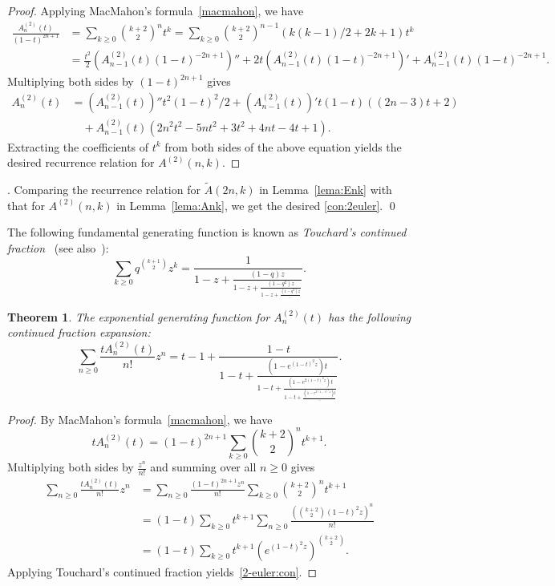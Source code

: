 \documentclass[11pt,reqno]{amsart}
\numberwithin{equation}{section}
\theoremstyle{plain}
\newtheorem{theorem}{Theorem}[section]
\theoremstyle{definition}
\begin{document}
\begin{proof}
Applying MacMahon's formula~\eqref{macmahon}, we have
\begin{align*}
\frac{A_n^{(2)}(t)}{(1-t)^{2n+1}}&=\sum_{k\geq 0}\binom{k+2}{2}^n t^k=\sum_{k\geq 0}\binom{k+2}{2}^{n-1}(k(k-1)/2+2k+1) t^k\\
&=\frac{t^2}{2}(A_{n-1}^{(2)}(t)(1-t)^{-2n+1})''+2t(A_{n-1}^{(2)}(t)(1-t)^{-2n+1})'+A_{n-1}^{(2)}(t)(1-t)^{-2n+1}.
\end{align*}
Multiplying both sides by $(1-t)^{2n+1}$ gives
\begin{align*}
A_n^{(2)}(t)&=(A_{n-1}^{(2)}(t))''t^2(1-t)^2/2+(A_{n-1}^{(2)}(t))'t(1-t)((2n-3)t+2)\\
&\quad+A_{n-1}^{(2)}(t)(2n^2t^2-5nt^2+3t^2+4nt-4t+1).
\end{align*}
Extracting the coefficients of $t^k$ from both sides of the above equation yields the desired recurrence relation for $A^{(2)}(n,k)$.
\end{proof}

. Comparing the recurrence relation for $\tilde A(2n,k)$ in Lemma~\ref{lema:Enk} with that for $A^{(2)}(n,k)$ in Lemma~\ref{lema:Ank}, we get the desired \eqref{con:2euler}. \qed

The following fundamental generating function is known as {\em Touchard's
continued fraction}~\cite{Tou} (see also~\cite{Prod}):
$$
\sum_{k\geq0}q^{\binom{k+1}{2}}z^k=\frac{1}{1-z+\displaystyle\frac{(1-q)z}{1-z+\displaystyle\frac{(1-q^2)z}{1-z+\displaystyle\frac{(1-q^3)z}{\cdots}}}}.
$$


\begin{theorem}\label{thm:2-euler:con}
The exponential generating function for $A_n^{(2)}(t)$ has the following continued fraction expansion:
\begin{equation}\label{2-euler:con}
\sum_{n\geq0}\frac{tA_n^{(2)}(t)}{n!}z^n=t-1+\frac{1-t}{1-t+\displaystyle\frac{(1-e^{(1-t)^2z})t}{1-t+\displaystyle\frac{(1-e^{2(1-t)^2z})t}{1-t+\displaystyle\frac{(1-e^{3(1-t)^2z})t}{\cdots}}}}.
\end{equation}
\end{theorem}
\begin{proof}
By MacMahon's formula~\eqref{macmahon}, we have
$$
tA_n^{(2)}(t)=(1-t)^{2n+1}\sum_{k\geq 0}\binom{k+2}{2}^n t^{k+1}.
$$
Multiplying both sides by $\frac{z^n}{n!}$ and summing over all $n\geq0$ gives
\begin{align*}
\sum_{n\geq0}\frac{tA_n^{(2)}(t)}{n!}z^n&=\sum_{n\geq0}\frac{(1-t)^{2n+1}z^n}{n!}\sum_{k\geq 0}\binom{k+2}{2}^n t^{k+1}\\
&=(1-t)\sum_{k\geq0}t^{k+1}\sum_{n\geq0}\frac{(\binom{k+2}{2}(1-t)^2z)^n}{n!}\\
&=(1-t)\sum_{k\geq0}t^{k+1}(e^{(1-t)^2z})^{\binom{k+2}{2}}.
\end{align*}
Applying Touchard's continued fraction yields~\eqref{2-euler:con}.
\end{proof}
\end{document}
